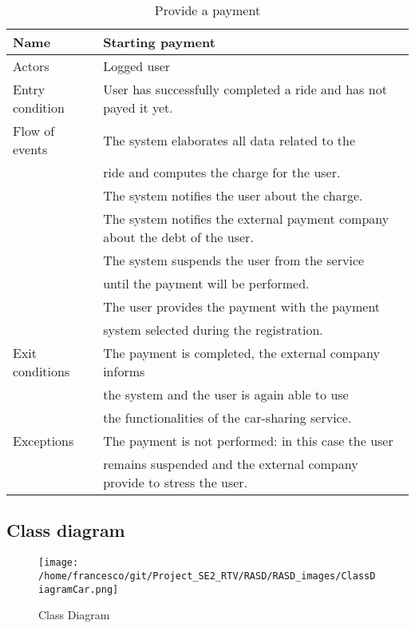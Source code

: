 \documentclass[10pt, a4paper,titlepage]{article}
\begin{document}
\begin{table}[!t]
\caption{Provide a payment} \label{tab:scenario13}
\begin{tabular}{|l|l|}
\hline
Name & Starting payment\\
\hline
Actors & Logged user\\ 
\hline
Entry condition & User has successfully completed a ride and has not payed it yet.\\
\hline
Flow of events & The system elaborates all data related to the\\
& ride and computes the charge for the user.\\
& The system notifies the user about the charge.\\
& The system notifies the external payment company about the debt of the user.\\
& The system suspends the user from the service\\
& until the payment will be performed.\\
& The user provides the payment with the payment \\
& system selected during the registration.\\
\hline
Exit conditions & The payment is completed, the external company informs\\
& the system and the user is again able to use \\
& the functionalities of the car-sharing service.\\
\hline
Exceptions & The payment is not performed: in this case the user\\
& remains suspended and the external company provide to stress the user.\\
\hline
\end{tabular}
\end{table}
\clearpage
\subsection{Class diagram}
\begin{figure}[!h]
\texttt{[image: /home/francesco/git/Project\_SE2\_RTV/RASD/RASD\_images/ClassDiagramCar.png]}
\caption{Class Diagram}
\label{fig:Class Diagram}
\end{figure}
\clearpage
\end{document}
